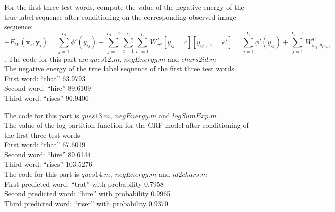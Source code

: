 \documentclass[11pt]{article}
\newcommand{\mbf}[1]{{\mathbf{#1}}}
\begin{document}
\begin{problem}{20}
 {For the first three test words, compute the value of the negative energy of the true label sequence after conditioning on the corresponding observed image sequence: 
$$-E_W(\mbf{x}_i,\mbf{y}_i)=\sum_{j=1}^{L_i} \phi'(y_{ij}) + \sum_{j=1}^{L_i-1}\sum_{c=1}^{C}\sum_{c'=1}^{C}W^T_{cc'}[y_{ij}=c][y_{ij+1}=c'] = \sum_{j=1}^{L_i} \phi'(y_{ij}) +\sum_{j=1}^{L_i-1}W^T_{y_{ij},y_{ij+1}}$$.}
The code for this part are $ques12.m$, $negEnergy.m$ and $chars2id.m$\\
The negative energy of the true label sequence of the first three test words\\
First word: ``that'' 63.9793\\
Second word: ``hire'' 89.6109\\
Third word: ``rises'' 96.9406

The code for this part is $ques13.m$, $negEnergy.m$ and $logSumExp.m$\\
The value of the log partition function for the CRF model after conditioning of the first three test words\\
First word: ``that'' 67.6019\\
Second word: ``hire'' 89.6144\\
Third word: ``rises'' 103.5276\\

The code for this part is $ques14.m$, $negEnergy.m$ and $id2chars.m	$\\
First predicted word: ``trat'' with probability 0.7958\\
Second predicted word: ``hire'' with probability 0.9965\\
Third predicted word: ``riser'' with probability 0.9370


\end{problem}
\end{document}
